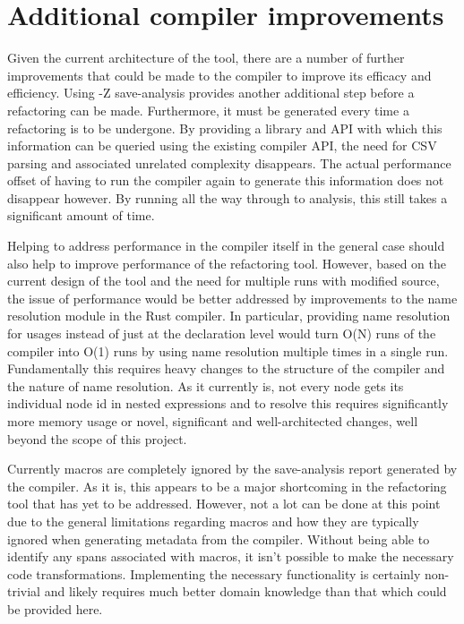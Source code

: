 
\section{Additional compiler improvements}
Given the current architecture of the tool, there are a number of further improvements that could be made to the compiler to improve its efficacy and efficiency. Using -Z save-analysis provides another additional step before a refactoring can be made. Furthermore, it must be generated every time a refactoring is to be undergone. By providing a library and API with which this information can be queried using the existing compiler API, the need for CSV parsing and associated unrelated complexity disappears. The actual performance offset of having to run the compiler again to generate this information does not disappear however.  By running all the way through to analysis, this still takes a significant amount of time. 


Helping to address performance in the compiler itself in the general case should also help to improve performance of the refactoring tool. However, based on the current design of the tool and the need for multiple runs with modified source, the issue of performance would be better addressed by improvements to the name resolution module in the Rust compiler. In particular, providing name resolution for usages instead of just at the declaration level would turn O(N) runs of the compiler into O(1) runs by using name resolution multiple times in a single run. Fundamentally this requires heavy changes to the structure of the compiler and the nature of name resolution. As it currently is, not every node gets its individual node id in nested expressions and to resolve this requires significantly more memory usage or novel, significant and well-architected changes, well beyond the scope of this project.


Currently macros are completely ignored by the save-analysis report generated by the compiler. As it is, this appears to be a major shortcoming in the refactoring tool that has yet to be addressed. However, not a lot can be done at this point due to the general limitations regarding macros and how they are typically ignored when generating metadata from the compiler. Without being able to identify any spans associated with macros, it isn't possible to make the necessary code transformations. Implementing the necessary functionality is certainly non-trivial and likely requires much better domain knowledge than that which could be provided here.

